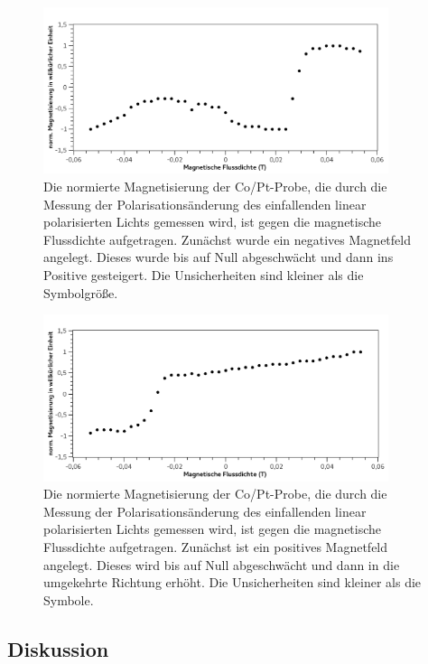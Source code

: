\documentclass[
	a4paper,
	12pt,
	pagesize,
	ngerman
]{scrartcl}
\begin{document}
	\begin{figure}[H]  
		\includegraphics[width=0.90\textwidth]{fig_magn1} %
		\centering
		\caption{Die normierte Magnetisierung der Co/Pt-Probe, die durch die Messung der Polarisationsänderung des einfallenden linear polarisierten Lichts gemessen wird, ist gegen die magnetische Flussdichte aufgetragen. 
		Zunächst wurde ein negatives Magnetfeld angelegt. 
		Dieses wurde bis auf Null abgeschwächt und dann ins Positive gesteigert. 
		Die Unsicherheiten sind kleiner als die Symbolgröße.} %
		\label{fig_magn1}
		\centering
	\end{figure}
	
	\begin{figure}[H] %
		\includegraphics[width=0.90\textwidth]{fig_magn2}
		\centering
		\caption{Die normierte Magnetisierung der Co/Pt-Probe, die durch die Messung der Polarisationsänderung des einfallenden linear polarisierten Lichts gemessen wird, ist gegen die magnetische Flussdichte aufgetragen. 
		Zunächst ist ein positives Magnetfeld angelegt. 
		Dieses wird bis auf Null abgeschwächt und dann in die umgekehrte Richtung erhöht.
		Die Unsicherheiten sind kleiner als die Symbole.} 
		\label{fig_magn2}
		\centering
	\end{figure}
	\subsection{Diskussion}
\end{document}

